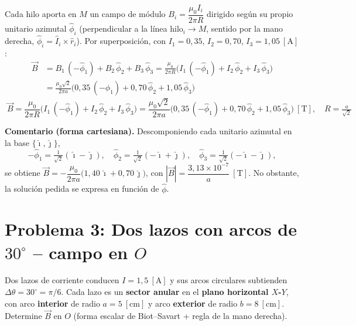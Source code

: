 \documentclass[12pt,letterpaper]{article}
\begin{document}
\medskip

\noindent Cada hilo aporta en $M$ un campo de m\'odulo $B_i=\dfrac{\mu_0 I_i}{2\pi R}$ dirigido seg\'un
su propio unitario azimutal $\hat{\phi}_i$ (perpendicular a la l\'inea hilo$_i\!\to\!M$, sentido por la
mano derecha, $\hat{\phi}_i=\hat{I}_i\times\hat{r}_i$). Por superposici\'on, con $I_1=0{,}35$,
$I_2=0{,}70$, $I_3=1{,}05\ [\text{A}]$:
\begin{align*}
    \vec{B} &= B_1\,(-\hat{\phi}_1) + B_2\,\hat{\phi}_2 + B_3\,\hat{\phi}_3
            = \frac{\mu_0}{2\pi R}\big(I_1\,(-\hat{\phi}_1) + I_2\,\hat{\phi}_2 + I_3\,\hat{\phi}_3\big)\\[2pt]
            &= \frac{\mu_0\sqrt{2}}{2\pi a}\big(0{,}35\,(-\hat{\phi}_1) + 0{,}70\,\hat{\phi}_2 + 1{,}05\,\hat{\phi}_3\big)
\end{align*}
\[
    \boxed{\;\vec{B} = \frac{\mu_0}{2\pi R}\big(I_1\,(-\hat{\phi}_1) + I_2\,\hat{\phi}_2 + I_3\,\hat{\phi}_3\big)
    = \frac{\mu_0\sqrt{2}}{2\pi a}\big(0{,}35\,(-\hat{\phi}_1) + 0{,}70\,\hat{\phi}_2 + 1{,}05\,\hat{\phi}_3\big)\ [\text{T}],
    \quad R=\tfrac{a}{\sqrt{2}}\;}
\]

\medskip
\noindent\small\textbf{Comentario (forma cartesiana).} Descomponiendo cada unitario azimutal en la
base $\{\hat{\imath},\hat{\jmath}\}$,
\[
    -\hat{\phi}_1 = \tfrac{1}{\sqrt2}(\hat{\imath}-\hat{\jmath}),\quad
    \hat{\phi}_2 = \tfrac{1}{\sqrt2}(-\hat{\imath}+\hat{\jmath}),\quad
    \hat{\phi}_3 = \tfrac{1}{\sqrt2}(-\hat{\imath}-\hat{\jmath}),
\]
se obtiene $\vec{B} = -\dfrac{\mu_0}{2\pi a}\big(1{,}40\,\hat{\imath} + 0{,}70\,\hat{\jmath}\big)$, con
$|\vec{B}| = \dfrac{3{,}13\times10^{-7}}{a}\ [\text{T}]$. No obstante, la soluci\'on pedida se expresa en
funci\'on de $\hat{\phi}$.\normalsize

\newpage

\section*{Problema 3: Dos lazos con arcos de $30^\circ$ -- campo en $O$}

\noindent Dos lazos de corriente conducen $I = 1{,}5\ [\text{A}]$ y sus arcos circulares
subtienden $\Delta\theta = 30^\circ = \pi/6$. Cada lazo es un \textbf{sector anular} en el
\textbf{plano horizontal $X$-$Y$}, con arco \textbf{interior} de radio $a = 5\ [\text{cm}]$ y arco
\textbf{exterior} de radio $b = 8\ [\text{cm}]$. Determine $\vec{B}$ en $O$ (forma escalar de
Biot--Savart + regla de la mano derecha).
\end{document}
